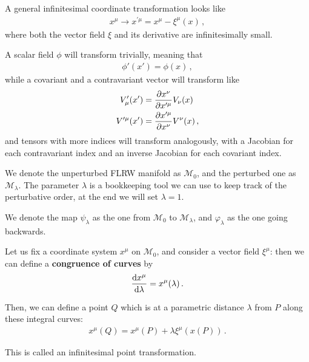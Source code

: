 \documentclass[main.tex]{subfiles}
\begin{document}

A general infinitesimal coordinate transformation looks like 
%
\begin{align}
x^{\mu } \to x^{\prime \mu } = x^{\mu } - \xi^{\mu }(x)
\,,
\end{align}
%
where both the vector field \(\xi \) and its derivative are infinitesimally small. 

A scalar field \(\phi \) will transform trivially, meaning that 
%
\begin{align}
\phi' (x') = \phi (x)
\,,
\end{align}
%
while a covariant and a contravariant vector will transform like 
%
\begin{align}
V^{\prime }_\mu (x') &= \pdv{x^{\nu }}{x^{\prime \mu }} V_\nu (x)  \\
V^{\prime \mu } (x') &= \pdv{x^{\prime \mu }}{x^{\nu }} V^{\nu }(x)
\,,
\end{align}
%
and tensors with more indices will transform analogously, with a Jacobian for each contravariant index and an inverse Jacobian for each covariant index. 

We denote the unperturbed FLRW manifold as \(\mathcal{M}_0\), and the perturbed one as \(\mathcal{M}_\lambda \). 
The parameter \(\lambda \) is a bookkeeping tool we can use to keep track of the perturbative order, at the end we will set \(\lambda = 1\). 

We denote the map \(\psi _\lambda \) as the one from \(\mathcal{M}_0\) to \(\mathcal{M}_\lambda \), and \(\varphi _\lambda \) as the one going backwards.  

Let us fix a coordinate system \(x^{\mu }\) on \(\mathcal{M}_0\), and consider a vector field \(\xi^{\mu }\): then we can define a \textbf{congruence of curves} by 
%
\begin{align}
\dv{x^{\mu }}{\lambda } = x^{\mu } (\lambda )
\,.
\end{align}

Then, we can define a point \(Q\) which is at a parametric distance \(\lambda \) from \(P\) along these integral curves: 
%
\begin{align}
x^{\mu } (Q) = x^{\mu } (P) + \lambda \xi ^{\mu } (x(P))
\,.
\end{align}

This is called an infinitesimal point transformation. 
\end{document}
